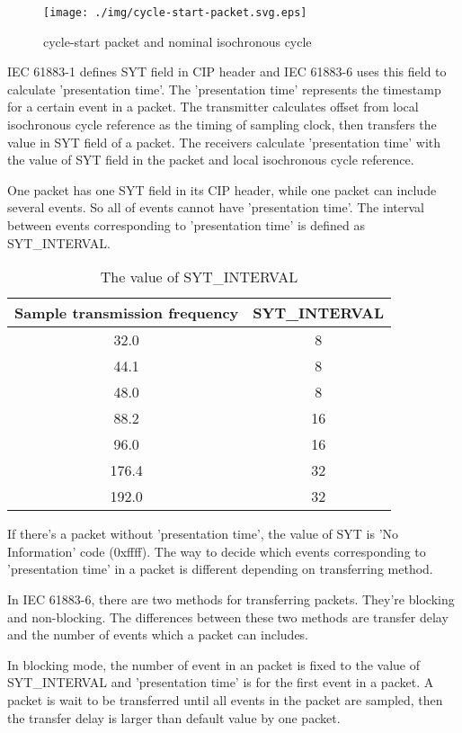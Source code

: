 \documentclass[onecolumn]{article}
\begin{document}
\begin{figure}[htbp]
\centering
\texttt{[image: ./img/cycle-start-packet.svg.eps]}
\caption{{cycle-start packet and nominal isochronous cycle}}
\label{cycle-start}
\end{figure}

IEC 61883-1 defines SYT field in CIP header and IEC 61883-6 uses this field to calculate 'presentation time'. The 'presentation time' represents the timestamp for a certain event in a packet. The transmitter calculates offset from local isochronous cycle reference as the timing of sampling clock, then transfers the value in SYT field of a packet. The receivers calculate 'presentation time' with the value of SYT field in the packet and local isochronous cycle reference.

One packet has one SYT field in its CIP header, while one packet can include several events. So all of events cannot have 'presentation time'. The interval between events corresponding to 'presentation time' is defined as SYT\_INTERVAL.

\begin{table}[ht]
	\centering
	\caption{{The value of SYT\_INTERVAL}}
	\label{syt_interval}
	\begin{tabular}{cc} \toprule
		Sample transmission frequency & SYT\_INTERVAL \\ \midrule
		32.0	& 8	\\
		44.1	& 8	\\
		48.0	& 8	\\
		88.2	& 16	\\
		96.0	& 16	\\
		176.4	& 32	\\
		192.0	& 32	\\ \bottomrule
	\end{tabular}
\end{table}

If there's a packet without 'presentation time', the value of SYT is 'No Information' code (0xffff). The way to decide which events corresponding to 'presentation time' in a packet is different depending on transferring method.

In IEC 61883-6\cite{iec61883-6-1,iec61883-6-2}, there are two methods for transferring packets. They're blocking and non-blocking. The differences between these two methods are transfer delay and the number of events which a packet can includes.

In blocking mode, the number of event in an packet is fixed to the value of SYT\_INTERVAL and 'presentation time' is for the first event in a packet. A packet is wait to be transferred until all events in the packet are sampled, then the transfer delay is larger than default value by one packet.
\end{document}
